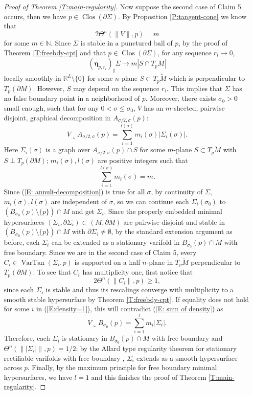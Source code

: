 \documentclass[10pt]{amsart}
\theoremstyle{definition}
\theoremstyle{remark}
\numberwithin{equation}{section}
\newcommand{\lc}{\llcorner}
\newcommand{\si}{\sigma}
\newcommand{\Si}{\Sigma}
\newcommand{\bleta}{\boldsymbol \eta}
\newcommand{\tM}{\widetilde{M}}
\newcommand{\VarTan}{\operatorname{VarTan}}
\newcommand{\Clos}{\operatorname{Clos}}
\begin{document}
\begin{proof}[Proof of Theorem \ref{T:main-regularity}]
Now suppose the second case of Claim 5 occurs, then we have $p \in \Clos(\partial \Sigma)$. By Proposition \ref{P:tangent-cone} we know that
\[2 \Theta^n (\|V\|,p)=m \]
for some $m \in \mathbb{N}$. Since $\Sigma$ is stable in a punctured ball of $p$, by the proof of Theorem \ref{T:freebdy-cpt} and that $p \in \Clos(\partial \Sigma)$, for any sequence $r_i \to 0$, 
\[ (\bleta_{p,r_i})_\sharp \Sigma \to m|S \cap T_p M| \]
locally smoothly in $\mathbb{R}^L \setminus \{0\}$ for some $n$-plane $S \subset T_p \tM$ which is perpendicular to $T_p(\partial M)$. However, $S$ may depend on the sequence $r_i$. This implies that $\Sigma$ has no false boundary point in a neighborhood of $p$.
Moreover, there exists $\si_0>0$ small enough, such that for any $0<\si\leq \si_0$, $V$ has an $m$-sheeted, pairwise disjoint, graphical decomposition in $A_{\si/2, \si}(p)$:
\begin{equation}
\label{E: annuli-decomposition}
V\lc A_{\si/2, \si}(p)=\sum_{i=1}^{l(\si)}m_i(\si) |\Si_i(\si)|.
\end{equation}
Here $\Si_i(\si)$ is a graph over $A_{\si/2, \si}(p)\cap S$ for some $m$-plane $S\subset T_p\tM$ with $S\perp T_p(\partial M)$; $m_i(\si), l(\si)$ are positive integers such that
\begin{equation}
\label{E: sum of density}
\sum_{i=1}^{l(\si)}m_i(\si)=m.
\end{equation}
Since (\ref{E: annuli-decomposition}) is true for all $\si$, by continuity of $\Si$, $m_i(\si), l(\si)$ are independent of $\si$, so we can continue each $\Si_i(\si_0)$ to $(B_{\si_0}(p)\setminus\{p\})\cap M$ and get $\Si_i$. Since the properly embedded minimal hypersurfaces $(\Si_i,\partial \Si_i) \subset (M,\partial M)$ are pairwise disjoint and stable in $(B_{\si_0}(p)\setminus\{p\})\cap M$ with $\partial \Sigma_i \neq \emptyset$, by the standard extension argument as before, each $\Si_i$ can be extended as a stationary varifold in $B_{\si_0}(p)\cap M$ with free boundary. Since we are in the second case of Claim 5, every $C_i\in \VarTan(\Si_i, p)$ is supported on a half $n$-plane in $T_p \tM$ perpendicular to $T_p(\partial M)$. To see that $C_i$ has multiplicity one, first notice that
\begin{equation}
\label{E:density=1}
2  \Theta^n(\|C_i\|,p) \geq 1, 
\end{equation}
since each $\Si_i$ is stable and thus its rescalings converge with multiplicity to a smooth stable hypersurface by Theorem \ref{T:freebdy-cpt}. If equality does not hold for some $i$ in (\ref{E:density=1}), this will contradict (\ref{E: sum of density}) as 
\[ V\lc B_{\si_0}(p)= \sum_{i=1}^l m_i |\Si_i|.\]
Therefore, each $\Si_i$ is stationary in $B_{\si_0}(p) \cap M$ with free boundary and $\Theta^n(\||\Sigma_i|\|,p)=1/2$; by the Allard type regularity theorem for stationary rectifiable varifolds with free boundary \cite[Theorem 4.13]{Gruter-Jost86}, $\Si_i$ extends as a smooth hypersurface across $p$. Finally, by the maximum principle for free boundary minimal hypersurfaces, we have $l=1$ and this finishes the proof of Theorem \ref{T:main-regularity}.
\end{proof}
\end{document}
